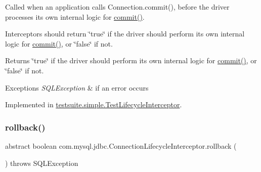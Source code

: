 Called when an application calls Connection.\+commit(), before the driver processes its own internal logic for \mbox{\hyperlink{interfacecom_1_1mysql_1_1jdbc_1_1_connection_lifecycle_interceptor_ac8f559b2bf353ede24b6845d5edeeeb0}{commit()}}.

Interceptors should return \char`\"{}true\char`\"{} if the driver should perform its own internal logic for \mbox{\hyperlink{interfacecom_1_1mysql_1_1jdbc_1_1_connection_lifecycle_interceptor_ac8f559b2bf353ede24b6845d5edeeeb0}{commit()}}, or \char`\"{}false\char`\"{} if not.

\begin{DoxyReturn}{Returns}
\char`\"{}true\char`\"{} if the driver should perform its own internal logic for \mbox{\hyperlink{interfacecom_1_1mysql_1_1jdbc_1_1_connection_lifecycle_interceptor_ac8f559b2bf353ede24b6845d5edeeeb0}{commit()}}, or \char`\"{}false\char`\"{} if not.
\end{DoxyReturn}

\begin{DoxyExceptions}{Exceptions}
{\em S\+Q\+L\+Exception} & if an error occurs \\
\hline
\end{DoxyExceptions}


Implemented in \mbox{\hyperlink{classtestsuite_1_1simple_1_1_test_lifecycle_interceptor_a1c51358948a855403a8953f3d4ba5590}{testsuite.\+simple.\+Test\+Lifecycle\+Interceptor}}.

\mbox{\label{interfacecom_1_1mysql_1_1jdbc_1_1_connection_lifecycle_interceptor_a1e23e5b6724c8362009e5d87938507de}} 
\subsubsection{\texorpdfstring{rollback()}{rollback()}\hspace{0.1cm}{\footnotesize\ttfamily [1/2]}}
{\footnotesize\ttfamily abstract boolean com.\+mysql.\+jdbc.\+Connection\+Lifecycle\+Interceptor.\+rollback (\begin{DoxyParamCaption}{ }\end{DoxyParamCaption}) throws S\+Q\+L\+Exception\hspace{0.3cm}{\ttfamily [abstract]}}

